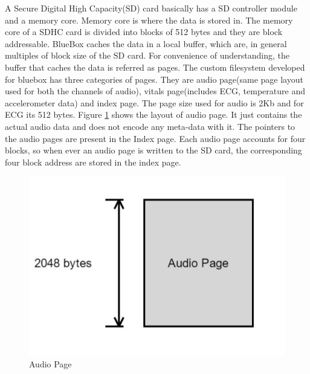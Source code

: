 A Secure Digital High Capacity(SD) card basically has a SD controller module and a memory core. Memory core is where the data is stored in. The memory core of a SDHC card is divided into blocks of 512 bytes and they are block addressable.  BlueBox caches the data in a local buffer, which  are, in general multiples of block size of the SD card. For convenience of understanding, the buffer that caches the data is referred as pages. The custom filesystem developed for bluebox has three categories of pages. They are audio page(same page layout used for both the channels of audio), vitals page(includes ECG, temperature and accelerometer data) and index page. The page size used for audio is 2Kb and for ECG its 512 bytes.
 Figure \ref{audio_page} shows the layout of audio page. It just contains the actual audio data and does not encode any meta-data with it. The pointers to the audio pages are present in the Index page. Each audio page accounts for four blocks, so when ever an audio page is written to the SD card, the corresponding four block address are stored in the index page. 
\begin{figure}[h]
	\centering
	\hspace*{-2cm} 
	\includegraphics[scale = 0.5 ]{audio_page.JPG}
	\caption{Audio Page\label{audio_page}}
\end{figure}

